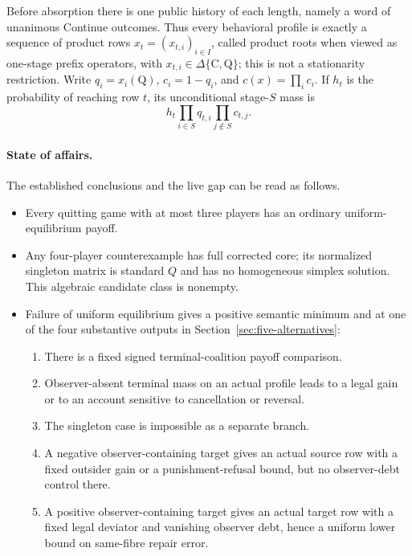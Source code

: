 \documentclass[11pt]{article}
\begin{document}
Before absorption there is one public history of each length, namely a word
of unanimous Continue outcomes.  Thus every behavioral profile is exactly a
sequence of product rows $x_t=(x_{t,i})_{i\in I}$, called product roots when
viewed as one-stage prefix operators, with
$x_{t,i}\in\Delta\{\mathrm C,\mathrm Q\}$; this is not a stationarity
restriction.  Write $q_i=x_i(\mathrm Q)$, $c_i=1-q_i$, and
$c(x)=\prod_i c_i$.  If $h_t$ is the probability of reaching row $t$, its
unconditional stage-$S$ mass is
\[
 h_t\prod_{i\in S}q_{t,i}\prod_{j\notin S}c_{t,j}.
\]

\paragraph{State of affairs.}
The established conclusions and the live gap can be read as follows.
\begin{itemize}
\item Every quitting game with at most three players has an ordinary
      uniform-equilibrium payoff.
\item Any four-player counterexample has full corrected core; its normalized
      singleton matrix is standard $Q$ and has no homogeneous simplex
      solution.  This algebraic candidate class is nonempty.
\item Failure of uniform equilibrium gives a positive semantic minimum and at
      one of the four substantive outputs in
      Section~\ref{sec:five-alternatives}:
      \begin{enumerate}
      \item There is a fixed signed terminal-coalition payoff comparison.
      \item Observer-absent terminal mass on an actual profile leads to a legal
            gain or to an account sensitive to cancellation or reversal.
      \item The singleton case is impossible as a separate branch.
      \item A negative observer-containing target gives an actual source row with a fixed
            outsider gain or a punishment-refusal bound, but no observer-debt
            control there.
      \item A positive observer-containing target gives an actual target row with a fixed legal
            deviator and vanishing observer debt, hence a uniform lower bound
            on same-fibre repair error.
      \end{enumerate}
\end{itemize}
\end{document}

